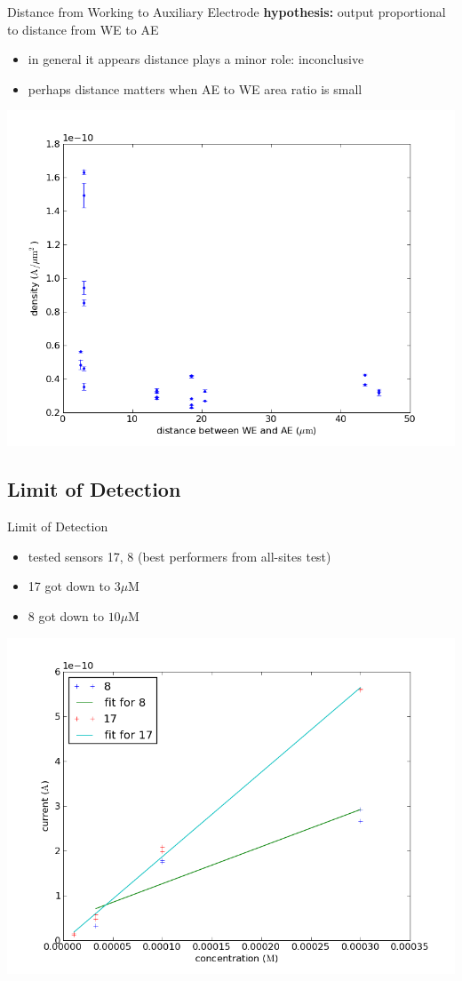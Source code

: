 \documentclass[10pt]{beamer}
\begin{document}
\begin{frame}{Distance from Working to Auxiliary Electrode}
	\textbf{hypothesis:} output proportional to distance from WE to AE
	\begin{itemize}
		\item in general it appears distance plays a minor role: inconclusive
		\item perhaps distance matters when AE to WE area ratio is small
	\end{itemize}
	\includegraphics[width=0.8\linewidth]{figures/distance_v_density.png}
\end{frame}

\subsection{Limit of Detection}
\begin{frame}{Limit of Detection}
	\begin{itemize}
		\item tested sensors 17, 8 (best performers from all-sites test)
		\item 17 got down to $3 \mu \mathrm{M}$
		\item 8 got down to $10 \mu \mathrm{M}$
	\end{itemize}
	\includegraphics[width=0.8\linewidth]{figures/limit.png}
\end{frame}
\end{document}

